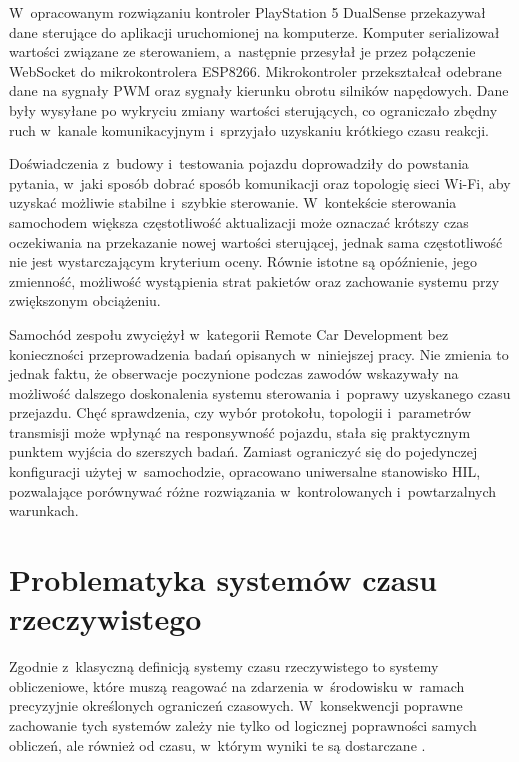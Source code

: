 W~opracowanym rozwiązaniu kontroler PlayStation 5 DualSense przekazywał dane sterujące do aplikacji uruchomionej na komputerze.
Komputer serializował wartości związane ze sterowaniem, a~następnie przesyłał je przez połączenie WebSocket do mikrokontrolera ESP8266.
Mikrokontroler przekształcał odebrane dane na sygnały PWM oraz sygnały kierunku obrotu silników napędowych.
Dane były wysyłane po wykryciu zmiany wartości sterujących, co ograniczało zbędny ruch w~kanale komunikacyjnym i~sprzyjało uzyskaniu krótkiego czasu reakcji.

Doświadczenia z~budowy i~testowania pojazdu doprowadziły do powstania pytania, w~jaki sposób dobrać sposób komunikacji oraz topologię sieci Wi-Fi, aby uzyskać możliwie stabilne i~szybkie sterowanie.
W~kontekście sterowania samochodem większa częstotliwość aktualizacji może oznaczać krótszy czas oczekiwania na przekazanie nowej wartości sterującej, jednak sama częstotliwość nie jest wystarczającym kryterium oceny.
Równie istotne są opóźnienie, jego zmienność, możliwość wystąpienia strat pakietów oraz zachowanie systemu przy zwiększonym obciążeniu.

Samochód zespołu zwyciężył w~kategorii Remote Car Development bez konieczności przeprowadzenia badań opisanych w~niniejszej pracy.
Nie zmienia to jednak faktu, że obserwacje poczynione podczas zawodów wskazywały na możliwość dalszego doskonalenia systemu sterowania i~poprawy uzyskanego czasu przejazdu.
Chęć sprawdzenia, czy wybór protokołu, topologii i~parametrów transmisji może wpłynąć na responsywność pojazdu, stała się praktycznym punktem wyjścia do szerszych badań.
Zamiast ograniczyć się do pojedynczej konfiguracji użytej w~samochodzie, opracowano uniwersalne stanowisko HIL, pozwalające porównywać różne rozwiązania w~kontrolowanych i~powtarzalnych warunkach.

\section{Problematyka systemów czasu rzeczywistego}

Zgodnie z~klasyczną definicją systemy czasu rzeczywistego to systemy obliczeniowe, które muszą reagować na zdarzenia w~środowisku w~ramach precyzyjnie określonych ograniczeń czasowych.
W~konsekwencji poprawne zachowanie tych systemów zależy nie tylko od logicznej poprawności samych obliczeń, ale również od czasu, w~którym wyniki te są dostarczane \cite{buttazzo2011}.

